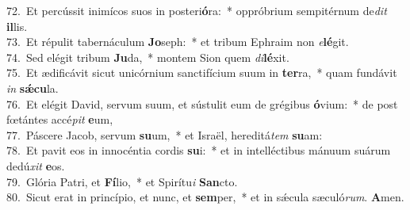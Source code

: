{72.~}Et percússit inimícos suos in posteri\textbf{ó}ra:~* oppróbrium sempitérnum de\textit{dit} \textbf{il}lis.\\
{73.~}Et répulit tabernáculum \textbf{Jo}seph:~* et tribum Ephraim non \textit{e}\textbf{lé}git.\\
{74.~}Sed elégit tribum \textbf{Ju}da,~* montem Sion quem \textit{di}\textbf{lé}xit.\\
{75.~}Et ædificávit sicut unicórnium sanctifícium suum in \textbf{ter}ra,~* quam fundávit \textit{in} \textbf{sǽ}\textbf{cu}la.\\
{76.~}Et elégit David, servum suum, et sústulit eum de grégibus \textbf{ó}vium:~* de post fœtántes accé\textit{pit} \textbf{e}um,\\
{77.~}Páscere Jacob, servum \textbf{su}um,~* et Israël, hereditá\textit{tem} \textbf{su}am:\\
{78.~}Et pavit eos in innocéntia cordis \textbf{su}i:~* et in intelléctibus mánuum suárum dedú\textit{xit} \textbf{e}os.\\
{79.~}Glória Patri, et \textbf{Fí}lio,~* et Spirítu\textit{i} \textbf{San}cto.\\
{80.~}Sicut erat in princípio, et nunc, et \textbf{sem}per,~* et in sǽcula sæculó\textit{rum}. \textbf{A}men.\\
